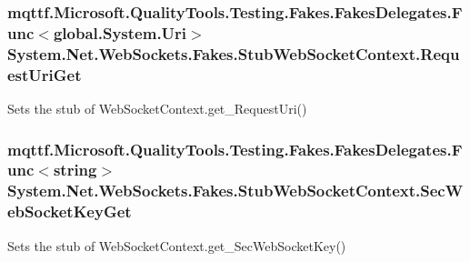 \hypertarget{class_system_1_1_net_1_1_web_sockets_1_1_fakes_1_1_stub_web_socket_context_a17fd2302a414d813a7e1d298bfdffe8e}{
\subsubsection[{Request\-Uri\-Get}]{\setlength{\rightskip}{0pt plus 5cm}mqttf.\-Microsoft.\-Quality\-Tools.\-Testing.\-Fakes.\-Fakes\-Delegates.\-Func$<$global.\-System.\-Uri$>$ System.\-Net.\-Web\-Sockets.\-Fakes.\-Stub\-Web\-Socket\-Context.\-Request\-Uri\-Get}}\label{class_system_1_1_net_1_1_web_sockets_1_1_fakes_1_1_stub_web_socket_context_a17fd2302a414d813a7e1d298bfdffe8e}


Sets the stub of Web\-Socket\-Context.\-get\-\_\-\-Request\-Uri()

\hypertarget{class_system_1_1_net_1_1_web_sockets_1_1_fakes_1_1_stub_web_socket_context_a81f361205c84607b3b25b395b20436ac}{
\subsubsection[{Sec\-Web\-Socket\-Key\-Get}]{\setlength{\rightskip}{0pt plus 5cm}mqttf.\-Microsoft.\-Quality\-Tools.\-Testing.\-Fakes.\-Fakes\-Delegates.\-Func$<$string$>$ System.\-Net.\-Web\-Sockets.\-Fakes.\-Stub\-Web\-Socket\-Context.\-Sec\-Web\-Socket\-Key\-Get}}\label{class_system_1_1_net_1_1_web_sockets_1_1_fakes_1_1_stub_web_socket_context_a81f361205c84607b3b25b395b20436ac}


Sets the stub of Web\-Socket\-Context.\-get\-\_\-\-Sec\-Web\-Socket\-Key()


